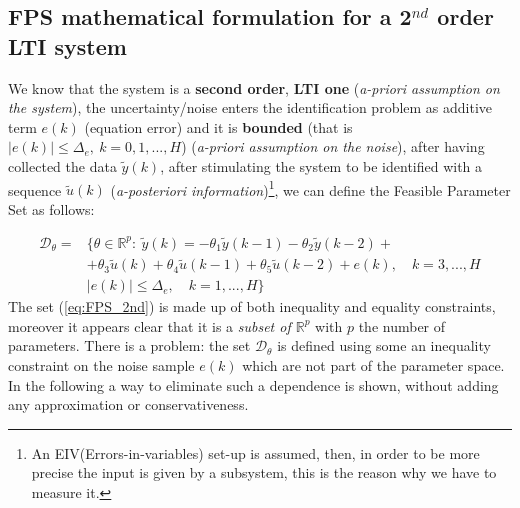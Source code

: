 \subsection{FPS mathematical formulation for a 2$^{nd}$ order LTI system}
We know that the system is a \textbf{second order}, \textbf{LTI one} (\textit{a-priori assumption on the system}), the uncertainty/noise enters the identification problem as additive term $e(k)$ (equation error) and it is \textbf{bounded} (that is $\vert e(k)\vert \le \Delta_e, \ k=0,1, ..., H$) (\textit{a-priori assumption on the noise}), after having collected the data $\tilde{y}(k)$, after stimulating the system to be identified with a sequence $\tilde{u}(k)$ (\textit{a-posteriori information})\footnote{
    An EIV(Errors-in-variables) set-up is assumed, then, in order to be more precise the input is given by a subsystem, this is the reason why we have to measure it.
}, we can define the \textsf{Feasible Parameter Set} as follows:

\begin{equation} \label{eq:FPS_2nd}
    \begin{aligned}
        \mathcal{D}_\theta=&\{\theta\in\mathbb{R}^p: \ 
                \tilde{y}(k)=-\theta_1\tilde{y}(k-1)
                -\theta_2\tilde{y}(k-2)+\\
                &+\theta_3\tilde{u}(k)
                +\theta_4\tilde{u}(k-1)
                +\theta_5\tilde{u}(k-2)+e(k), \quad k=3,...,H\\
                &  \vert e(k) \vert \le \Delta_e, \quad k=1,...,H
        \}
    \end{aligned}
\end{equation}
The set (\ref{eq:FPS_2nd}) is made up of both inequality and equality constraints, moreover it appears clear that it is a \textit{subset of $\mathbb{R}^p$} with $p$ the number of parameters. There is a problem: the set $\mathcal{D}_\theta$ is defined using some an inequality constraint on the noise sample $e(k)$ which are not part of the parameter space. In the following a way to eliminate such a dependence is shown, without adding any approximation or conservativeness.

